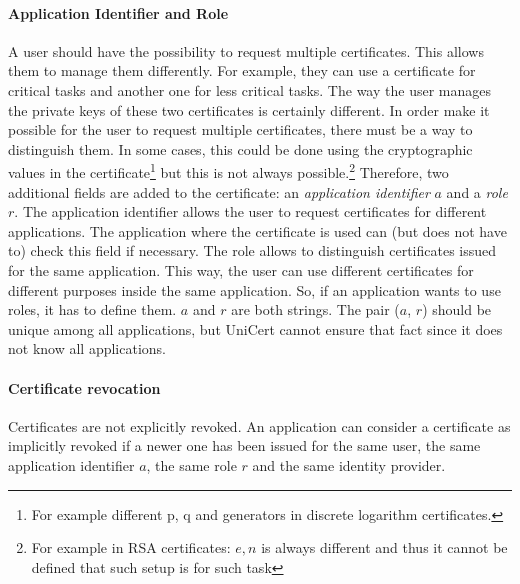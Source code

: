 \documentclass[bibtotoc,halfparskip,oneside]{scrreprt}
\begin{document}
\paragraph*{Application Identifier and Role} A user should have the possibility to request multiple certificates. This allows them to manage them differently. For example, they can use a certificate for critical tasks and another one for less critical tasks. The way the user manages the private keys of these two certificates is certainly different. In order make it possible for the user to request multiple certificates, there must be a way to distinguish them. In some cases, this could be done using the cryptographic values in the certificate\footnote{For example different p, q and generators in discrete logarithm certificates.} but this is not always possible.\footnote{For example in RSA certificates: $e,n$ is always different and thus it cannot be defined that such setup is for such task} Therefore, two additional fields are added to the certificate: an \textit{application identifier} $a$ and a \textit{role} $r$. The application identifier allows the user to request certificates for different applications. The application where the certificate is used can (but does not have to) check this field if necessary. The role allows to distinguish certificates issued for the same application. This way, the user can use different certificates for different purposes inside the same application. So, if an application wants to use roles, it has to define them. $a$ and $r$ are both strings. The pair ($a$, $r$) should be unique among all applications, but UniCert cannot ensure that fact since it does not know all applications.

\paragraph*{Certificate revocation} Certificates are not explicitly revoked. An application can consider a certificate as implicitly revoked if a newer one has been issued for the same user, the same application identifier $a$, the same role $r$ and the same identity provider.

\end{document}
